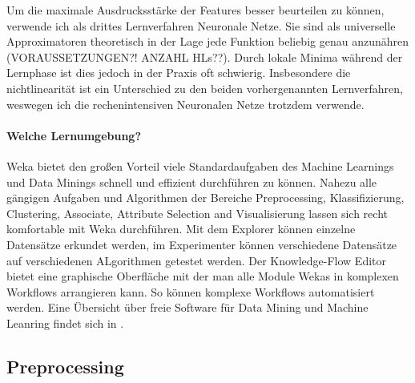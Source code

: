 Um die maximale Ausdrucksstärke der Features besser beurteilen zu können, verwende ich als drittes Lernverfahren Neuronale Netze. Sie sind als universelle Approximatoren theoretisch in der Lage jede Funktion beliebig genau anzunähren \cite{???} (VORAUSSETZUNGEN?! ANZAHL HLs??). Durch lokale Minima während der Lernphase ist dies jedoch in der Praxis oft schwierig. Insbesondere die nichtlinearität ist ein Unterschied zu den beiden vorhergenannten Lernverfahren, weswegen ich die rechenintensiven Neuronalen Netze trotzdem verwende.

\paragraph*{Welche Lernumgebung?}
Weka bietet den großen Vorteil viele Standardaufgaben des Machine Learnings und Data Minings schnell und effizient durchführen zu können. Nahezu alle gängigen Aufgaben und Algorithmen der Bereiche Preprocessing, Klassifizierung, Clustering, Associate, Attribute Selection and Visualisierung lassen sich recht komfortable mit Weka durchführen. Mit dem Explorer können einzelne Datensätze erkundet werden, im Experimenter können verschiedene Datensätze auf verschiedenen ALgorithmen getestet werden. Der Knowledge-Flow Editor bietet eine graphische Oberfläche mit der man alle Module Wekas in komplexen Workflows arrangieren kann. So können komplexe Workflows automatisiert werden. Eine Übersicht über freie Software für Data Mining und Machine Leanring findet sich in \cite{Jovic&Brkic&Bogunovic}.

\subsection{Preprocessing}


